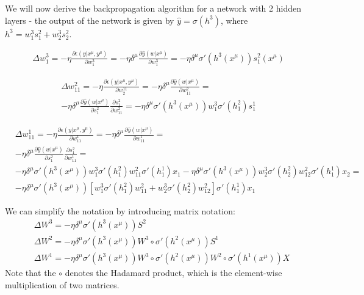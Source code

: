 \documentclass[11pt]{book} %
\begin{document}
We will now derive the backpropagation algorithm for a network with 2 hidden layers - 
the output of the network is given by $\hat{y} = \sigma(h^3)$, where $h^3 = w_1^3 s_1^2 + w_2^3 s_2^2$.

\begin{align*}
    \Delta w_{1}^{3} = -\eta \frac{\partial \epsilon (y|x^{\mu},y^{\mu})}{\partial w_{1}^{3}} = -\eta \delta^\mu \frac{\partial \hat{y}(w|x^{\mu})}{\partial w_{1}^{3}} = 
    -\eta \delta^\mu \sigma'(h^{3}(x^{\mu})) s_{1}^2(x^{\mu}) 
\end{align*}

\begin{align*}
    \Delta w_{11}^{2} = -\eta \frac{\partial \epsilon (y|x^{\mu},y^{\mu})}{\partial w_{2}^{11}} = -\eta \delta^\mu \frac{\partial \hat{y}(w|x^{\mu})}{\partial w_{11}^{2}} = \\
    -\eta \delta^\mu \frac{\partial \hat{y}(w|x^{\mu})}{\partial s_{1}^{2}} \frac{\partial s_{1}^{2}}{\partial w_{11}^{2}} = -\eta \delta^\mu \sigma'(h^{3}(x^{\mu})) w_{1}^{3} \sigma'(h_{1}^{2}) s_{1}^1
\end{align*}

\begin{align*}
    &\Delta w_{11}^{1} = -\eta \frac{\partial \epsilon (y|x^{\mu},y^{\mu})}{\partial w_{11}^{1}} = -\eta \delta^\mu \frac{\partial \hat{y}(w|x^{\mu})}{\partial w_{11}^{1}} = \\ 
    &-\eta \delta^\mu \frac{\partial \hat{y}(w|x^{\mu})}{\partial s_{1}^{2}} \frac{\partial s_{1}^{2}}{\partial w_{11}^{1}} = \\ 
    &-\eta \delta^\mu \sigma'(h^{3}(x^{\mu})) w_{1}^{3} \sigma'(h_{1}^{2}) w_{11}^{2} \sigma'(h_{1}^{1}) x_{1} 
    - \eta \delta^\mu \sigma'(h^{3}(x^{\mu})) w_{2}^{3} \sigma'(h_{2}^{2}) w_{12}^{2} \sigma'(h_{1}^{1}) x_{2} = \\
    &-\eta \delta^\mu \sigma'(h^{3}(x^{\mu})) \left[ w_{1}^{3} \sigma'(h_{1}^{2}) w_{11}^{2}  + w_{2}^{3} \sigma'(h_{2}^{2}) w_{12}^{2} \right] \sigma'(h_{1}^{1}) x_{1}
\end{align*}

We can simplify the notation by introducing matrix notation:
\begin{align*}
    &\Delta W^{3} = -\eta \delta^\mu \sigma'(h^{3}(x^{\mu})) S^{2} \\
    &\Delta W^{2} = -\eta \delta^\mu \sigma'(h^{3}(x^{\mu})) W^{3} \circ \sigma'(h^{2}(x^{\mu})) S^{1} \\
    &\Delta W^{1} = -\eta \delta^\mu \sigma'(h^{3}(x^{\mu})) W^{3} \circ \sigma'(h^{2}(x^{\mu})) W^{2} \circ \sigma'(h^{1}(x^{\mu})) X
\end{align*}
Note that the $\circ$ denotes the Hadamard product, which is the element-wise multiplication of two matrices.
\end{document}
